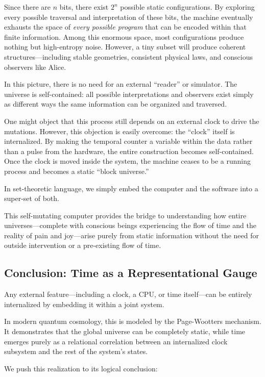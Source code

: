 Since there are $n$ bits, there exist $2^n$ possible static configurations. 
By exploring every possible traversal and interpretation of these bits, the machine eventually exhausts the space of \emph{every possible program} that can be encoded within that finite information. 
Among this enormous space, most configurations produce nothing but high-entropy noise. 
However, a tiny subset will produce coherent structures---including stable geometries, consistent physical laws, and conscious observers like Alice.

In this picture, there is no need for an external ``reader'' or simulator. 
The universe is self-contained: all possible interpretations and observers exist simply as different ways the same information can be organized and traversed.

One might object that this process still depends on an external clock to drive the mutations. 
However, this objection is easily overcome: the ``clock'' itself is internalized. 
By making the temporal counter a variable within the data rather than a pulse from the hardware, the entire construction becomes self-contained. 
Once the clock is moved inside the system, the machine ceases to be a running process and becomes a static ``block universe.''

In set-theoretic language, we simply embed the computer and the software into a super-set of both. 

This self-mutating computer provides the bridge to understanding how entire universes---complete with conscious beings experiencing the flow of time and the reality of pain and joy---arise purely from static information without the need for outside intervention or a pre-existing flow of time.


\subsection*{Conclusion: Time as a Representational Gauge}

Any external feature—including a clock, a CPU, or time itself—can be entirely internalized by embedding it within a joint system.

In modern quantum cosmology, this is modeled by the Page-Wootters \cite{page1983clock} mechanism.
It demonstrates that the global universe can be completely static,
while time emerges purely as a relational correlation between an internalized clock subsystem and the rest of the system's states. 

We push this realization to its logical conclusion:



